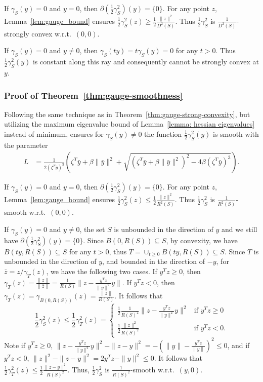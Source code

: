\documentclass[sn-mathphys,Numbered]{sn-jnl}%
\begin{document}
If $\gamma_S(y)=0$ and $y=0$, then $\partial (\frac{1}{2}\gamma_S^2)(y) = \{0\}$. For any point $z$, Lemma~\ref{lem:gauge_bound} ensures $\frac{1}{2}\gamma_S^2(z)\geq \frac{1}{2}\frac{\|z\|^2}{D^2(S)}$. Thus $\frac{1}{2}\gamma_S^2$ is $\frac{1}{D^2(S)}$-strongly convex w.r.t.~$(0,0)$.

If $\gamma_S(y) = 0$ and $y\neq 0$, then $\gamma_S(ty)=t\gamma_S(y)=0$ for any $t>0$. Thus $\frac{1}{2}\gamma_S^2(y)$ is constant along this ray and consequently cannot be strongly convex at $y$.

\subsubsection{Proof of Theorem~\ref{thm:gauge-smoothness}} \label{pf:gauge-smoothness}
Following the same technique as in Theorem~\ref{thm:gauge-strong-convexity}, but utilizing the maximum eigenvalue bound of Lemma~\ref{lemma: hessian eigenvalues} instead of minimum, ensures for $\gamma_S(y) \neq 0$ the function $\frac{1}{2}\gamma_S^2(y)$ is smooth with the parameter
\begin{align*}
L &= \frac{1}{2( \zeta^T \bar y)^3}\left( \zeta^T \bar y+\beta\|\bar y\|^2+\sqrt{\left( \zeta ^T\bar y+\beta\|\bar y\|^2\right)^2-4\beta( \zeta^T \bar y)^3}\right).
\end{align*}


If $\gamma_S(y)=0$ and $y=0$, then $\partial(\frac{1}{2}\gamma_S^2)(y) = \{0\}$. For any point $z$, Lemma~\ref{lem:gauge_bound} ensures $\frac{1}{2}\gamma_S^2(z) \leq \frac{1}{2}\frac{\|z\|^2}{R^2(S)}$. Thus $\frac{1}{2}\gamma_S^2$ is $\frac{1}{R^2(S)}$-smooth w.r.t.~$(0,0)$.

If $\gamma_S(y)=0$ and $y \neq 0$, the set $S$ is unbounded in the direction of $y$ and we still have $\partial (\frac{1}{2}\gamma_S^2)(y) = \{0\}$. Since $B(0,R(S)) \subseteq S$, by convexity, we have $B(ty,R(S)) \subseteq S$ for any $t>0$, thus $T=\cup_{t\geq0} B(ty, R(S)) \subseteq S$. Since $T$ is unbounded in the direction of $y$, and bounded in the direction of $-y$, for $\bar z=z/\gamma_T(z)$, we have the following two cases. If $y^T z \geq 0$, then $\gamma_T(z) =\frac{\|z\|}{\|\bar z\|}=\frac{1}{R(S)}\|z-\frac{y^Tz}{\|y\|^2}y\|$. If $y^Tz  <0$, then $\gamma_T(z)=\gamma_{B(0,R(S))}(z)=\frac{\|z\|}{R(S)}$. It follows that
\begin{equation*}
\frac{1}{2}\gamma_S^2(z) \leq \frac{1}{2}\gamma_T^2(z) = \begin{cases} \frac{1}{2} \frac{1}{R(S)^2}\|z-\frac{y^Tz}{\|y\|^2}y\|^2 & \text{if } y^Tz \geq 0 \\ \frac{1}{2}\frac{\|z\|^2}{R(S)^2} & \text{if } y^Tz  <0.
\end{cases}
\end{equation*}
Note if $y^Tz \geq 0$, $\|z-\frac{y^Tz}{\|y\|^2}y\|^2-\|z-y\|^2 =-\left(\|y\|-\frac{y^Tz}{\|y\|}\right)^2 \leq 0$, and if $y^Tz <0$, $\|z\|^2-\|z-y\|^2 = 2y^Tz-\|y\|^2 \leq 0 $. It follows that $\frac{1}{2}\gamma^2_T(z) \leq \frac{1}{2}\frac{\|z-y\|^2}{R(S)^2}$. Thus, $\frac{1}{2}\gamma_S^2$ is $\frac{1}{R(S)^2}$-smooth w.r.t.~$(y,0)$.
\end{document}
